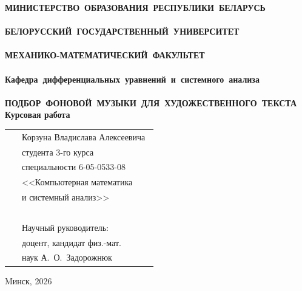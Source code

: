 \setcounter{page}{1}
\thispagestyle{empty}
\begin{center}
\bf
\vspace{4cm}
{
\mbox{МИНИСТЕРСТВО~ОБРАЗОВАНИЯ~РЕСПУБЛИКИ~БЕЛАРУСЬ} \\~\\
\mbox{БЕЛОРУССКИЙ~ГОСУДАРСТВЕННЫЙ~УНИВЕРСИТЕТ} \\~\\
\mbox{МЕХАНИКО-МАТЕМАТИЧЕСКИЙ~ФАКУЛЬТЕТ} \\~\\
\mbox{Кафедра~дифференциальных~уравнений~и~системного~анализа} \\~\\
}
\vspace{4cm}
\bf
\mbox{ПОДБОР ФОНОВОЙ МУЗЫКИ ДЛЯ ХУДОЖЕСТВЕННОГО ТЕКСТА}\\
\vspace{1cm}
\rm Курсовая работа
\vspace{3cm}
\end{center}
\begin{tabular}{ll}
\hspace{10.5cm}
&Корзуна Владислава Алексеевича~\\
&студента 3-го курса\\
&специальности 6-05-0533-08\\
&<<Компьютерная математика\\
&и системный анализ>>\\~\\
&Научный руководитель:\\
&доцент, кандидат физ.-мат.\\
&наук А.~О.~Задорожнюк
\end{tabular}
\vspace{3cm}
\begin{center}
Mинск, 2026
\end{center}
\clearpage
\restoregeometry
